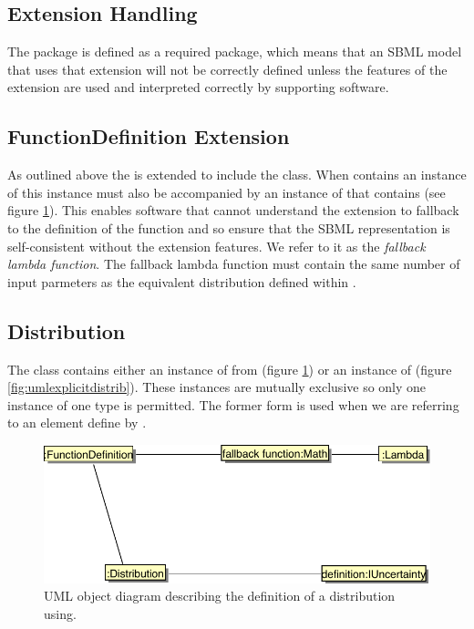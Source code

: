 \documentclass[draftspec]{sbmlpkgspec}
\begin{document}
\subsection{Extension Handling}

The \distrib package is defined as a required package, which means
that an SBML model that uses that extension will not be correctly
defined unless the features of the extension are used and interpreted
correctly by supporting software.

\subsection{FunctionDefinition Extension}

As outlined above the \FunctionDefinition is extended to include the
\Distribution class. When \FunctionDefinition contains an instance of
\Distribution this instance must also be accompanied \watchout by an
instance of \mmath that contains \mlambda (see figure
\ref{fig:umluncertmldistrib}). This enables software that cannot understand the
extension to fallback to the \mlambda definition of the function and
so ensure that the SBML representation is self-consistent without the
extension features. We refer to it as the \emph{fallback lambda
  function}.  The fallback lambda function must contain the same
number of input parmeters as the equivalent distribution defined
within \Distribution.

\subsection{Distribution}
\label{sec:distribution}

The  class contains either an instance of
\unidistrib from \uncertml (figure \ref{fig:umluncertmldistrib}) or an
instance of \mlambda (figure \ref{fig:umlexplicitdistrib}). These instances
are mutually exclusive so only one instance of one type is
permitted. The former form is used when we are referring to an
element define by \uncertml.

\begin{figure}[htb]
\includegraphics[width=0.7\linewidth]{uncertmlDistrib.pdf}
\caption{UML object diagram describing the definition of a
  distribution using\uncertml.}
\label{fig:umluncertmldistrib}
\end{figure}
 
\end{document}
